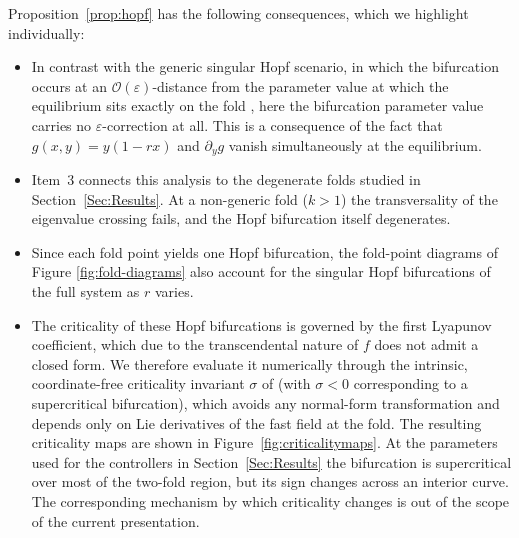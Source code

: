 \documentclass[3p]{elsarticle}
\theoremstyle{plain}
\theoremstyle{remark}
\theoremstyle{definition}
\begin{document}
Proposition~\ref{prop:hopf} has the following consequences, which we
highlight individually:
\begin{itemize}
\item  In contrast with the generic
singular Hopf scenario, in which the bifurcation occurs at an
$\mathcal{O}(\varepsilon)$-distance from the parameter value at which
the equilibrium sits exactly on the fold
\cite{Ref:Krupa2001,Ref:Kuehn2015}, here the bifurcation parameter
value carries no $\varepsilon$-correction at all. This is a consequence
of the fact that $g(x,y)=y(1-rx)$ and $\partial_y g$ vanish
simultaneously at the equilibrium.
\item Item~3 connects this analysis to the
degenerate folds studied in Section~\ref{Sec:Results}. At a non-generic
fold ($k> 1$) the transversality of the eigenvalue crossing fails, and the Hopf bifurcation itself degenerates.
\item Since each fold point yields
one Hopf bifurcation, the fold-point diagrams of Figure \ref{fig:fold-diagrams}
also account for the singular Hopf bifurcations of the full system
as $r$ varies.
\item The criticality of these Hopf bifurcations is governed by the
first Lyapunov coefficient, which due to the transcendental nature of
$f$ does not admit a closed form. We therefore evaluate it numerically
through the intrinsic, coordinate-free criticality invariant $\sigma$
of \cite{de2021intrinsic} (with $\sigma<0$ corresponding to a
supercritical bifurcation), which avoids any normal-form transformation
and depends only on Lie derivatives of the fast field at the fold. The
resulting criticality maps are shown in
Figure~\ref{fig:criticalitymaps}. At the parameters used for the
controllers in Section~\ref{Sec:Results} the bifurcation is
supercritical over most of the two-fold region, but its sign changes across an interior curve. The corresponding mechanism by which criticality changes is out of the scope of the current presentation.
\end{itemize}
\end{document}
